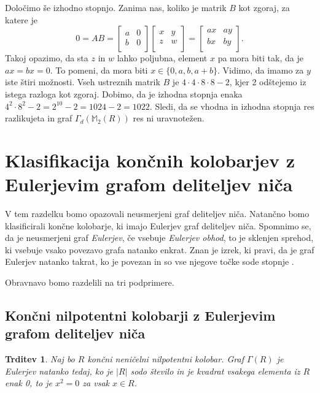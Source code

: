 \documentclass[a4paper, 12pt]{amsart}
\theoremstyle{definition} %
\theoremstyle{plain} %
\newtheorem{trditev}[definicija]{Trditev}
\newcommand{\M}{\mathbb M}
\begin{document}
Določimo še izhodno stopnjo. Zanima nas, koliko je matrik $B$ kot zgoraj, za katere je 
$$
0 = AB = \begin{bmatrix}
a & 0 \\
b & 0 \\
\end{bmatrix}
\begin{bmatrix}
x & y \\
z & w \\
\end{bmatrix}
=
\begin{bmatrix}
ax & ay \\
bx & by \\
\end{bmatrix}.
$$
Takoj opazimo, da sta $z$ in $w$ lahko poljubna, element $x$ pa mora biti tak, da je $ax = bx = 0$. To pomeni, da mora biti $x\in \{0,a,b,a+b\}$. Vidimo, da imamo za $y$ iste štiri možnosti. Vseh ustreznih matrik $B$ je  $4\cdot 4 \cdot 8 \cdot 8 -2$, kjer 2 odštejemo iz istega razloga kot zgoraj. Dobimo, da je izhodna stopnja enaka $4^2 \cdot 8^2 - 2 = 2^{10}-2 = 1024-2 = 1022$. Sledi, da se vhodna in izhodna stopnja res razlikujeta in graf $\Gamma_d(\M_2(R))$ res ni uravnotežen.
\endproof

\section{Klasifikacija končnih kolobarjev z Eulerjevim grafom deliteljev niča}
V tem razdelku bomo opazovali neusmerjeni graf deliteljev niča. Natančno bomo klasificirali končne kolobarje, ki imajo Eulerjev graf deliteljev niča.
Spomnimo se, da je neusmerjeni graf \emph{Eulerjev}, če vsebuje \emph{Eulerjev obhod}, to je sklenjen sprehod, ki vsebuje vsako povezavo grafa natanko enkrat. Znan je izrek, ki pravi, da je graf Eulerjev natanko takrat, ko je povezan in so vse njegove točke sode stopnje \cite[Izrek 1.8.1]{Diestel}.

 Obravnavo bomo razdelili na tri podprimere.

\subsection{Končni nilpotentni kolobarji z Eulerjevim grafom deliteljev niča}

\begin{trditev}
\label{EulerNilpotenten}
Naj bo $R$ končni neničelni nilpotentni kolobar. Graf $\Gamma(R)$ je Eulerjev natanko tedaj, ko je $|R|$ sodo število in je kvadrat vsakega elementa iz $R$ enak 0, to je $x^2=0$ za vsak $x\in R$.
\end{trditev}
\end{document}
